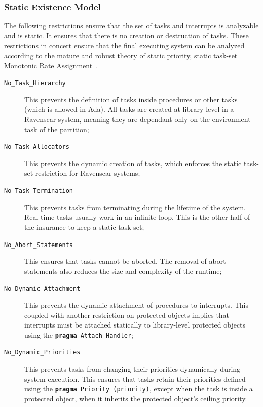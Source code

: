 \subsubsection{Static Existence Model}
The following restrictions ensure that the set of tasks and interrupts
is analyzable and is static. It ensures that there is no creation or
destruction of tasks. These restrictions in concert ensure that the
final executing system can be analyzed according to the mature and
robust theory of static priority, static task-set Monotonic Rate
Assignment~\cite{liu@jacm73}.

\begin{description}
\item[\texttt{No\_Task\_Hierarchy}] This prevents the definition of
  tasks inside procedures or other tasks (which is allowed in
  Ada). All tasks are created at library-level in a Ravenscar system,
  meaning they are dependant only on the environment task of the
  partition;

\item[\texttt{No\_Task\_Allocators}] This prevents the dynamic
creation of tasks, which enforces the static task-set restriction for
Ravenscar systems;

\item[\texttt{No\_Task\_Termination}] This prevents tasks from
terminating during the lifetime of the system. Real-time tasks usually
work in an infinite loop. This is the other half of the insurance to
keep a static task-set;

\item[\texttt{No\_Abort\_Statements}] This ensures that tasks
cannot be aborted. The removal of abort statements also reduces the
size and complexity of the runtime;

\item[\texttt{No\_Dynamic\_Attachment}] This prevents the dynamic
attachment of procedures to interrupts. This coupled with another
restriction on protected objects implies that interrupts must be
attached statically to library-level protected objects using the
\texttt{\textbf{pragma} Attach\_Handler};

\item[\texttt{No\_Dynamic\_Priorities}] This prevents tasks from
changing their priorities dynamically during system execution. This
ensures that tasks retain their priorities defined using the
\texttt{\textbf{pragma} Priority (priority)}, except when the task is
inside a protected object, when it inherits the protected object's
ceiling priority.
\end{description}

